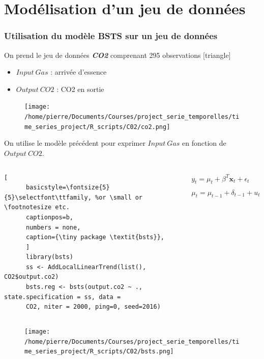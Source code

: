 \documentclass{presentation_template}
\begin{document}


\section{Modélisation d'un jeu de données}

\begin{frame}
  \frametitle{Utilisation du modèle BSTS sur un jeu de données}
  
  On prend le jeu de données \textbf{\textit{CO2}} comprenant 295 observations
  [triangle]
  \begin{itemize}
    \item $Input\ Gas$ : arrivée d'essence
    \item $Output\ CO2$ : CO2 en sortie
  \end{itemize}
  \begin{figure}
    \texttt{[image: /home/pierre/Documents/Courses/project\_serie\_temporelles/time\_series\_project/R\_scripts/C02/co2.png]} 
  \end{figure}
\end{frame}

\begin{frame}[fragile]
  \small On utilise le modèle précédent pour exprimer $Input\ Gas$ en fonction de $Output\ CO2$.
\begin{columns}
  \begin{column}{0.5\textwidth}
    \vspace{0.2cm}
    \begin{lstlisting}[
      basicstyle=\fontsize{5}{5}\selectfont\ttfamily, %or \small or \footnotesize etc.
      captionpos=b,
      numbers = none,
      caption={\tiny package \textit{bsts}},
      ]
      library(bsts)
      ss <- AddLocalLinearTrend(list(), CO2$output.co2)
      bsts.reg <- bsts(output.co2 ~ ., state.specification = ss, data =
      CO2, niter = 2000, ping=0, seed=2016)
    \end{lstlisting}
    
    \vspace{-0.5cm}
  \end{column}
  \begin{column}{0.5\textwidth}
    {\small
  $\begin{array}{ll}{y_{t}=\mu_{t}+\beta^{T} \mathbf{x}_{t}+\epsilon_{t}} & {\epsilon_{t} \sim \mathcal{}{}{N}\left(0, \sigma_{\epsilon}^{2}\right)} \\
   {\mu_{t}=\mu_{t-1}+\delta_{t-1}+u_{t}} & {u_{t} \sim \mathcal{N}\left(0, \sigma_{u}^{2}\right)}\end{array}$
    }
  \end{column}
\end{columns}
\begin{figure}
  \texttt{[image: /home/pierre/Documents/Courses/project\_serie\_temporelles/time\_series\_project/R\_scripts/C02/bsts.png]} 
\end{figure}
\end{frame}
\end{document}
